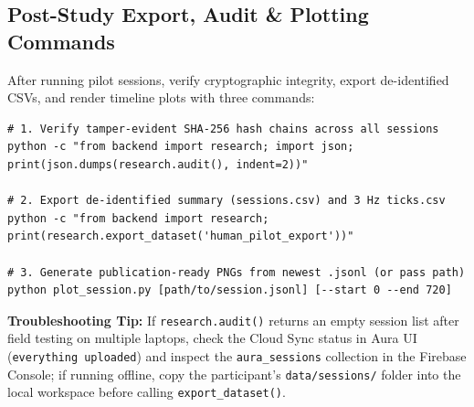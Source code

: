 \documentclass[11pt,a4paper]{article}
\newcommand{\notebox}[2]{%
  \vspace{0.2cm}\noindent
  \colorbox{CalloutBg}{%
    \parbox{\dimexpr\textwidth-2\fboxsep\relax}{%
      \small \textbf{\color{AuraTeal}#1:} #2%
    }%
  }\vspace{0.25cm}%
}
\begin{document}
\subsection{Post-Study Export, Audit \& Plotting Commands}
After running pilot sessions, verify cryptographic integrity, export de-identified CSVs, and render timeline plots with three commands:
\begingroup\small
\begin{verbatim}
# 1. Verify tamper-evident SHA-256 hash chains across all sessions
python -c "from backend import research; import json;
print(json.dumps(research.audit(), indent=2))"

# 2. Export de-identified summary (sessions.csv) and 3 Hz ticks.csv
python -c "from backend import research;
print(research.export_dataset('human_pilot_export'))"

# 3. Generate publication-ready PNGs from newest .jsonl (or pass path)
python plot_session.py [path/to/session.jsonl] [--start 0 --end 720]
\end{verbatim}
\endgroup

\notebox{Troubleshooting Tip}{If \texttt{research.audit()} returns an empty session list after field testing on multiple laptops, check the Cloud Sync status in Aura UI (\texttt{everything uploaded}) and inspect the \texttt{aura\_sessions} collection in the Firebase Console; if running offline, copy the participant's \texttt{data/sessions/} folder into the local workspace before calling \texttt{export\_dataset()}.}
\end{document}
